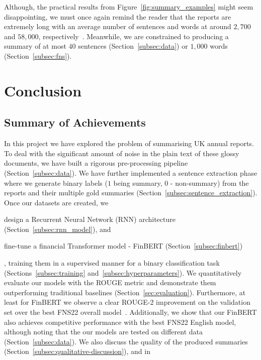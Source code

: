 Although, the practical results from Figure~\ref{fig:summary_examples} might seem disappointing, we must once again remind the reader that the reports are extremely
long with an average number of sentences and words at around $2,700$ and $58,000$, respectively~\cite{litvak-vanetik-2021-summarization}.
Meanwhile, we are constrained to producing a summary of at most $40$ sentences (Section~\ref{subsec:data}) or $1,000$ words (Section~\ref{subsec:fns}).


\section{Conclusion}\label{sec:conclusion}
\subsection{Summary of Achievements}\label{subsec:summary}
In this project we have explored the problem of summarising UK annual reports.
To deal with the significant amount of noise in the plain text of these glossy documents, we have built a rigorous pre-processing pipeline (Section~\ref{subsec:data}).
We have further implemented a sentence extraction phase where we generate binary labels ($1$ being summary, $0$ - non-summary) from the reports and their multiple gold summaries (Section~\ref{subsec:sentence_extraction}).
Once our datasets are created, we
\begin{enumerate*}
    \item design a Recurrent Neural Network (RNN) architecture (Section~\ref{subsec:rnn_model}), and
    \item fine-tune a financial Transformer model - FinBERT (Section~\ref{subsec:finbert})
\end{enumerate*},
training them in a supervised manner for a binary classification task (Sections~\ref{subsec:training} and~\ref{subsec:hyperparameters}).
We quantitatively evaluate our models with the ROUGE metric and demonstrate them outperforming traditional baselines (Section~\ref{sec:evaluation}).
Furthermore, at least for FinBERT we observe a clear ROUGE-2 improvement on the validation set over the best FNS22 overall model~\cite{foroutan-etal-2022-multilingual}.
Additionally, we show that our FinBERT also achieves competitive performance with the best FNS22 English model,
although noting that the our models are tested on different data (Section~\ref{subsec:data}).
We also discuss the quality of the produced summaries (Section~\ref{subsec:qualitative-discussion}), and in
